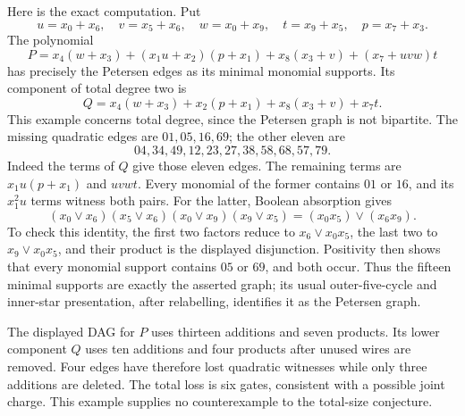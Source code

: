 Here is the exact computation. Put
\[
 u=x_0+x_6,\quad v=x_5+x_6,\quad w=x_0+x_9,
 \quad t=x_9+x_5,\quad p=x_7+x_3.
\]
The polynomial
\[
 P=x_4(w+x_3)+(x_1u+x_2)(p+x_1)
       +x_8(x_3+v)+(x_7+uvw)t
\]
has precisely the Petersen edges as its minimal monomial supports. Its
component of total degree two is
\[
 Q=x_4(w+x_3)+x_2(p+x_1)+x_8(x_3+v)+x_7t.
\]
This example concerns total degree, since the Petersen graph is not
bipartite. The missing quadratic edges are $01,05,16,69$; the other eleven are
\[
 04,34,49,12,23,27,38,58,68,57,79.
\]
Indeed the terms of $Q$ give those eleven edges. The remaining terms are $x_1u(p+x_1)$ and $uvwt$. Every monomial of the former contains $01$ or $16$, and its $x_1^2u$ terms witness both pairs. For the latter, Boolean absorption gives
\[
 (x_0\vee x_6)(x_5\vee x_6)(x_0\vee x_9)(x_9\vee x_5)
 =(x_0x_5)\vee(x_6x_9).
\]
To check this identity, the first two factors reduce to $x_6\vee x_0x_5$, the last two to $x_9\vee x_0x_5$, and their product is the displayed disjunction. Positivity then shows that every monomial support contains $05$ or $69$, and both occur. Thus the fifteen minimal supports are exactly the asserted graph; its usual outer-five-cycle and inner-star presentation, after relabelling, identifies it as the Petersen graph.


The displayed DAG for $P$ uses thirteen additions and seven products.
Its lower component $Q$ uses ten additions and four products after
unused wires are removed. Four edges have therefore lost quadratic
witnesses while only three additions are deleted. The total loss is six
gates, consistent with a possible joint charge. This example supplies no
counterexample to the total-size conjecture.
